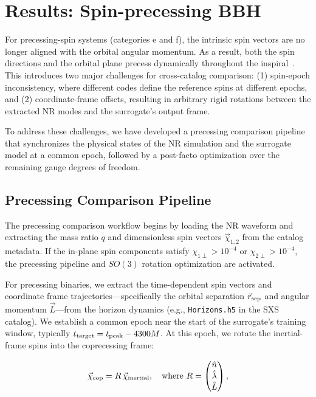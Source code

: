 \documentclass[%
 reprint,
superscriptaddress,
 amsmath,amssymb,
 aps,
]{revtex4-2}
\begin{document}
\section{Results: Spin-precessing BBH}

For precessing-spin systems (categories e and f), the intrinsic spin vectors are no longer aligned with the orbital angular momentum. As a result, both the spin directions and the orbital plane precess dynamically throughout the inspiral~\cite{Apostolatos:1994mx, Schmidt:2010it, Hannam:2013oca}. This introduces two major challenges for cross-catalog comparison: (1) spin-epoch inconsistency, where different codes define the reference spins at different epochs, and (2) coordinate-frame offsets, resulting in arbitrary rigid rotations between the extracted NR modes and the surrogate's output frame.

To address these challenges, we have developed a precessing comparison pipeline that synchronizes the physical states of the NR simulation and the surrogate model at a common epoch, followed by a post-facto optimization over the remaining gauge degrees of freedom.

\subsection{Precessing Comparison Pipeline}

The precessing comparison workflow begins by loading the NR waveform and extracting the mass ratio $q$ and dimensionless spin vectors $\vec{\chi}_{1,2}$ from the catalog metadata. If the in-plane spin components satisfy $\chi_{1\perp} > 10^{-4}$ or $\chi_{2\perp} > 10^{-4}$, the precessing pipeline and $SO(3)$ rotation optimization are activated.

For precessing binaries, we extract the time-dependent spin vectors and coordinate frame trajectories—specifically the orbital separation $\vec{r}_{\rm sep}$ and angular momentum $\vec{L}$—from the horizon dynamics (e.g., \texttt{Horizons.h5} in the SXS catalog). We establish a common epoch near the start of the surrogate's training window, typically $t_{\rm target} = t_{\rm peak} - 4300M$. At this epoch, we rotate the inertial-frame spins into the coprecessing frame:

\begin{equation}\vec{\chi}_{\rm cop} = R\,\vec{\chi}_{\rm inertial}, \quad \text{where } R = \begin{pmatrix} \hat{n} \\ \hat{\lambda} \\ \hat{L} \end{pmatrix},\end{equation}
\end{document}
